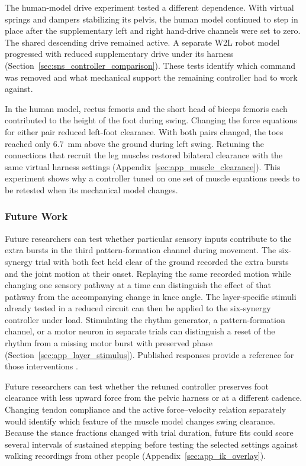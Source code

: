 The human-model drive experiment tested a different dependence. With virtual springs and dampers stabilizing its pelvis, the human model continued to step in place after the supplementary left and right hand-drive channels were set to zero. The shared descending drive remained active. A separate W2L robot model progressed with reduced supplementary drive under its harness (Section~\ref{sec:sns_controller_comparison}). These tests identify which command was removed and what mechanical support the remaining controller had to work against.

In the human model, rectus femoris and the short head of biceps femoris each contributed to the height of the foot during swing. Changing the force equations for either pair reduced left-foot clearance. With both pairs changed, the toes reached only \qty{6.7}{\milli\meter} above the ground during left swing. Retuning the connections that recruit the leg muscles restored bilateral clearance with the same virtual harness settings (Appendix~\ref{sec:app_muscle_clearance}). This experiment shows why a controller tuned on one set of muscle equations needs to be retested when its mechanical model changes.

\subsubsection{Future Work}\label{sec:fw_pipeline}\label{sec:fw_cpg}

Future researchers can test whether particular sensory inputs contribute to the extra bursts in the third pattern-formation channel during movement. The six-synergy trial with both feet held clear of the ground recorded the extra bursts and the joint motion at their onset. Replaying the same recorded motion while changing one sensory pathway at a time can distinguish the effect of that pathway from the accompanying change in knee angle. The layer-specific stimuli already tested in a reduced circuit can then be applied to the six-synergy controller under load. Stimulating the rhythm generator, a pattern-formation channel, or a motor neuron in separate trials can distinguish a reset of the rhythm from a missing motor burst with preserved phase (Section~\ref{sec:app_layer_stimulus}). Published responses provide a reference for those interventions \citep{selionov_tonic_2009,rybak_modelling_2006,markin_afferent_2010,shevtsova_modeling_2016}.

Future researchers can test whether the retuned controller preserves foot clearance with less upward force from the pelvic harness or at a different cadence. Changing tendon compliance and the active force--velocity relation separately would identify which feature of the muscle model changes swing clearance. Because the stance fractions changed with trial duration, future fits could score several intervals of sustained stepping before testing the selected settings against walking recordings from other people (Appendix~\ref{sec:app_ik_overlay}).

